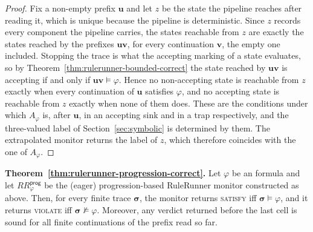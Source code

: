 \begin{proof}
Fix a non-empty prefix $\boldsymbol{u}$ and let $z$ be the state the pipeline
reaches after reading it, which is unique because the pipeline is
deterministic. Since $z$ records every component the pipeline carries, the
states reachable from $z$ are exactly the states reached by the prefixes
$\boldsymbol{u}\boldsymbol{v}$, for every continuation $\boldsymbol{v}$, the
empty one included. Stopping the trace is what the accepting marking of a state
evaluates, so by Theorem~\ref{thm:rulerunner-bounded-correct} the state reached
by $\boldsymbol{u}\boldsymbol{v}$ is accepting if and only if
$\boldsymbol{u}\boldsymbol{v}\models\varphi$. Hence no non-accepting state is
reachable from $z$ exactly when every continuation of $\boldsymbol{u}$ satisfies
$\varphi$, and no accepting state is reachable from $z$ exactly when none of
them does. These are the conditions under which $A_\varphi$ is, after
$\boldsymbol{u}$, in an accepting sink and in a trap respectively, and the
three-valued label of Section~\ref{sec:symbolic} is determined by them. The
extrapolated monitor returns the label of $z$, which therefore coincides with
the one of $A_\varphi$.
\end{proof}


\noindent
\textbf{Theorem~\ref{thm:rulerunner-progression-correct}.}
Let $\varphi$ be an \ltlf formula and let $RR^{\mathsf{prog}}_\varphi$ be the (eager) progression-based RuleRunner monitor constructed as above. Then, for every finite  trace $\boldsymbol{\sigma}$, the monitor returns \textsc{satisfy} iff $\boldsymbol{\sigma}\models\varphi$, and it returns \textsc{violate} iff $\boldsymbol{\sigma}\not\models\varphi$. Moreover, any verdict returned before the last cell is sound for all finite continuations of the prefix read so far.

